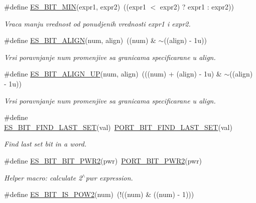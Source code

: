 \begin{DoxyCompactItemize}
\#define \hyperlink{group__kern__bit__intf_gabe39387086f6e3e5e890e3db62107c76}{E\-S\-\_\-\-B\-I\-T\-\_\-\-M\-I\-N}(expr1, expr2)~((expr1 $<$ expr2) ? expr1 \-: expr2))
\begin{DoxyCompactList}\small\item\em Vraca manju vrednost od ponudjenih vrednosti {\itshape expr1} i {\itshape expr2}. \end{DoxyCompactList}\item 
\#define \hyperlink{group__kern__bit__intf_ga55a29735acc8e36b91a83f45c2676c3b}{E\-S\-\_\-\-B\-I\-T\-\_\-\-A\-L\-I\-G\-N}(num, align)~((num) \& $\sim$((align) -\/ 1u))
\begin{DoxyCompactList}\small\item\em Vrsi poravnjanje {\itshape num} promenjive sa granicama specificarane u {\itshape align}. \end{DoxyCompactList}\item 
\#define \hyperlink{group__kern__bit__intf_ga652db2c31a8b995b76b153fd9b7e0474}{E\-S\-\_\-\-B\-I\-T\-\_\-\-A\-L\-I\-G\-N\-\_\-\-U\-P}(num, align)~(((num) + (align) -\/ 1u) \& $\sim$((align) -\/ 1u))
\begin{DoxyCompactList}\small\item\em Vrsi poravnjanje {\itshape num} promenjive sa granicama specificarane u {\itshape align}. \end{DoxyCompactList}\item 
\#define \hyperlink{group__kern__bit__intf_ga73cfbd6aa5af684706a3058f4913b849}{E\-S\-\_\-\-B\-I\-T\-\_\-\-F\-I\-N\-D\-\_\-\-L\-A\-S\-T\-\_\-\-S\-E\-T}(val)~\hyperlink{group__template__cpu__intf_gad77a6570361843fdf0aafde890682a9a}{P\-O\-R\-T\-\_\-\-B\-I\-T\-\_\-\-F\-I\-N\-D\-\_\-\-L\-A\-S\-T\-\_\-\-S\-E\-T}(val)
\begin{DoxyCompactList}\small\item\em Find last set bit in a word. \end{DoxyCompactList}\item 
\#define \hyperlink{group__kern__bit__intf_gab287f6b5ae57be4391c98c9989a17742}{E\-S\-\_\-\-B\-I\-T\-\_\-\-B\-I\-T\-\_\-\-P\-W\-R2}(pwr)~\hyperlink{group__template__cpu__intf_gac2e9e677828a5a45989ba97e7f5b68ea}{P\-O\-R\-T\-\_\-\-B\-I\-T\-\_\-\-P\-W\-R2}(pwr)
\begin{DoxyCompactList}\small\item\em Helper macro\-: calculate 2$^\wedge$pwr expression. \end{DoxyCompactList}\item 
\#define \hyperlink{group__kern__bit__intf_gaeaeee96fdb6cca0a96da0b7da8f4fc14}{E\-S\-\_\-\-B\-I\-T\-\_\-\-I\-S\-\_\-\-P\-O\-W2}(num)~(!((num) \& ((num) -\/ 1)))

\end{DoxyCompactItemize}
